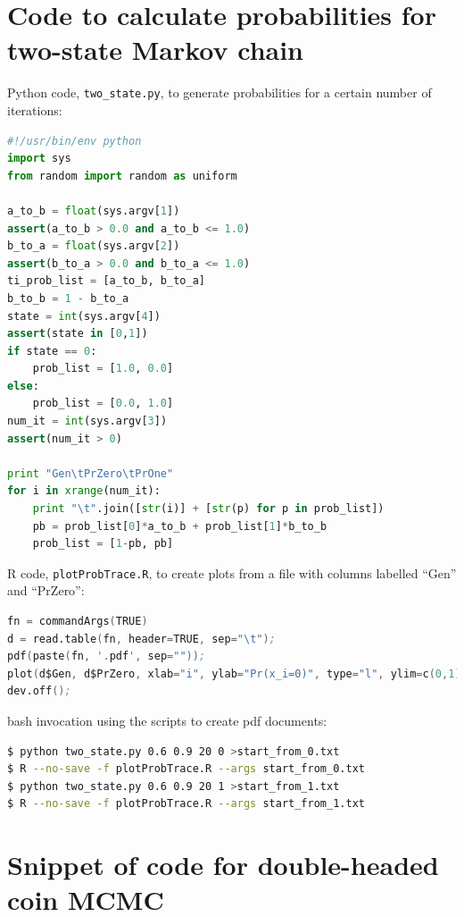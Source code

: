 \documentclass[11pt]{article}
\begin{document}
\section{Code to calculate probabilities for two-state Markov chain}\label{appendixCodeTwoProb}
Python code, {\tt two\_state.py}, to generate probabilities for a certain number of iterations:
\begin{lstlisting}[frame=single,language=Python,columns=fixed,upquote=false,showstringspaces=false]
#!/usr/bin/env python
import sys
from random import random as uniform

a_to_b = float(sys.argv[1])
assert(a_to_b > 0.0 and a_to_b <= 1.0)
b_to_a = float(sys.argv[2])
assert(b_to_a > 0.0 and b_to_a <= 1.0)
ti_prob_list = [a_to_b, b_to_a]
b_to_b = 1 - b_to_a
state = int(sys.argv[4])
assert(state in [0,1])
if state == 0:
    prob_list = [1.0, 0.0]
else:
    prob_list = [0.0, 1.0]
num_it = int(sys.argv[3])
assert(num_it > 0)

print "Gen\tPrZero\tPrOne"
for i in xrange(num_it):
    print "\t".join([str(i)] + [str(p) for p in prob_list])
    pb = prob_list[0]*a_to_b + prob_list[1]*b_to_b
    prob_list = [1-pb, pb]
\end{lstlisting}
R code, {\tt plotProbTrace.R}, to create plots from a file with columns labelled ``Gen'' and ``PrZero'':
\begin{lstlisting}[frame=single,language=S,columns=fixed,upquote=false,showstringspaces=false]
fn = commandArgs(TRUE)
d = read.table(fn, header=TRUE, sep="\t");
pdf(paste(fn, '.pdf', sep=""));
plot(d$Gen, d$PrZero, xlab="i", ylab="Pr(x_i=0)", type="l", ylim=c(0,1));
dev.off();
\end{lstlisting}
bash invocation using the scripts to create pdf documents:
\begin{lstlisting}[frame=single,language=bash,columns=fixed,upquote=false,showstringspaces=false]
$ python two_state.py 0.6 0.9 20 0 >start_from_0.txt
$ R --no-save -f plotProbTrace.R --args start_from_0.txt
$ python two_state.py 0.6 0.9 20 1 >start_from_1.txt
$ R --no-save -f plotProbTrace.R --args start_from_1.txt
\end{lstlisting}

\newpage
\section{Snippet of code for double-headed coin MCMC}
\end{document}
